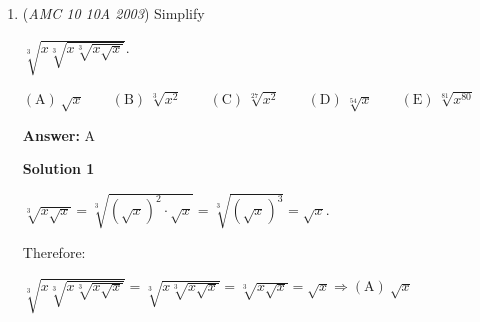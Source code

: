 \begin{enumerate}
 Since $60$ is indeed not a perfect square, it follows that half of its positive factors are less than $\sqrt{60} \approx 7.746$. This estimate clearly shows that there are not even any integers, let alone factors of $60$, between $7$ and $\sqrt{60}$. Accordingly, exactly half of the positive factors of $60$ are in fact less than $7$, so the answer is precisely $\boxed{\mathrm{(E)}\ \frac{1}{2}}$.

 



\textbf{Solution 2}

Testing all positive integers less than $7$, we find that $1$, $2$, $3$, $4$, $5$, and $6$ all divide $60$. The prime factorization of $60$ is $2^2 \cdot 3 \cdot 5$, so using the standard \href{https://artofproblemsolving.com/wiki/index.php?title=Divisor\_function}{formula for the number of divisors}, the total number of divisors of $60$ is $3 \cdot 2 \cdot 2 = 12$. Therefore, the required probability is $\frac{6}{12} = \boxed{\mathrm{(E)}\ \frac{1}{2}}$.

 



\textbf{Solution 3 (brute force)}

Though this is not recommended for reasons of time, one can simply write out all the factors of $60$, eventually finding that 
 \[60 = 1 \cdot 60 = 2 \cdot 30 = 3 \cdot 20 = 4 \cdot 15 = 5 \cdot 12 = 6 \cdot 10.\] Hence $60$ has $12$ factors, of which $6$ are less than $7$ (namely, $1$, $2$, $3$, $4$, $5$, and $6$), so the answer is $\frac{6}{12} = \boxed{\mathrm{(E)}\ \frac{1}{2}}$.

 


	\item (\textit{AMC 10 10A 2003}) Simplify 


 $\sqrt[3]{x\sqrt[3]{x\sqrt[3]{x\sqrt{x}}}}$.


 $\mathrm{(A) \ } \sqrt{x}\qquad \mathrm{(B) \ } \sqrt[3]{x^{2}}\qquad \mathrm{(C) \ } \sqrt[27]{x^{2}}\qquad \mathrm{(D) \ } \sqrt[54]{x}\qquad \mathrm{(E) \ } \sqrt[81]{x^{80}}$

 \textbf{Answer: }A



\textbf{Solution 1}

$\sqrt[3]{x\sqrt{x}}=\sqrt[3]{(\sqrt{x})^{2}\cdot\sqrt{x}}=\sqrt[3]{(\sqrt{x})^{3}}=\sqrt{x}$. 

 Therefore: 

 $\sqrt[3]{x\sqrt[3]{x\sqrt[3]{x\sqrt{x}}}}=\sqrt[3]{x\sqrt[3]{x\sqrt{x}}}=\sqrt[3]{x\sqrt{x}}= \sqrt{x} \Rightarrow \boxed{\mathrm{(A)}\ \sqrt{x}}$





\end{enumerate}
